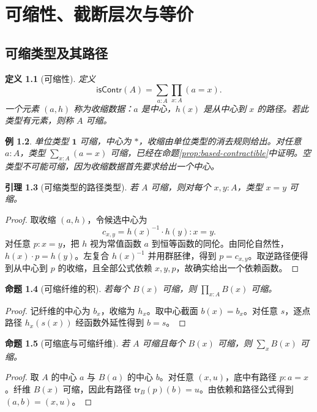 \documentclass[12pt,oneside,openany,fontset=none]{ctexbook}
\theoremstyle{cn}
\newtheorem{definition}{定义}[chapter]
\newtheorem{example}[definition]{例}
\newtheorem{lemma}[definition]{引理}
\newtheorem{proposition}[definition]{命题}
\numberwithin{equation}{chapter}
\newcommand{\tr}{\mathsf{tr}}
\newcommand{\isContr}{\mathsf{isContr}}
\newcommand{\one}{\mathbf 1}
\begin{document}
\chapter{可缩性、截断层次与等价}
\section{可缩类型及其路径}
\begin{definition}[可缩性]
定义
\[
\isContr(A)=\sum_{a:A}\prod_{x:A}(a=x).
\]
一个元素 $(a,h)$ 称为收缩数据：$a$ 是中心，$h(x)$ 是从中心到 $x$ 的路径。若此类型有元素，则称 $A$ 可缩。
\end{definition}
\begin{example}
单位类型 $\one$ 可缩，中心为 $*$，收缩由单位类型的消去规则给出。对任意 $a:A$，类型 $\sum_{x:A}(a=x)$ 可缩，已经在命题\ref{prop:based-contractible}中证明。空类型不可能可缩，因为收缩数据首先要求给出一个中心。
\end{example}
\begin{lemma}[可缩类型的路径类型]
若 $A$ 可缩，则对每个 $x,y:A$，类型 $x=y$ 可缩。
\end{lemma}
\begin{proof}
取收缩 $(a,h)$，令候选中心为
\[
c_{x,y}=h(x)^{-1}\cdot h(y):x=y.
\]
对任意 $p:x=y$，把 $h$ 视为常值函数 $a$ 到恒等函数的同伦。由同伦自然性，$h(x)\cdot p=h(y)$。左复合 $h(x)^{-1}$ 并用群胚律，得到 $p=c_{x,y}$。取逆路径便得到从中心到 $p$ 的收缩，且全部公式依赖 $x,y,p$，故确实给出一个依赖函数。
\end{proof}
\begin{proposition}[可缩纤维的积]
若每个 $B(x)$ 可缩，则 $\prod_{x:A}B(x)$ 可缩。
\end{proposition}
\begin{proof}
记纤维的中心为 $b_x$，收缩为 $h_x$。取中心截面 $b(x)=b_x$。对任意 $s$，逐点路径 $h_x(s(x))$ 经函数外延性得到 $b=s$。
\end{proof}
\begin{proposition}[可缩底与可缩纤维]
若 $A$ 可缩且每个 $B(x)$ 可缩，则 $\sum_xB(x)$ 可缩。
\end{proposition}
\begin{proof}
取 $A$ 的中心 $a$ 与 $B(a)$ 的中心 $b$。对任意 $(x,u)$，底中有路径 $p:a=x$。纤维 $B(x)$ 可缩，因此有路径 $\tr_B(p)(b)=u$。由依赖和路径公式得到 $(a,b)=(x,u)$。
\end{proof}
\end{document}
